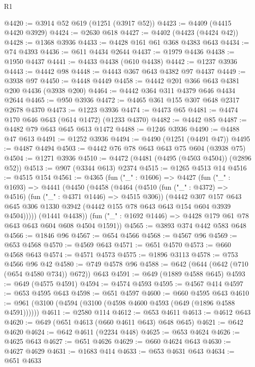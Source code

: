 \begin{lexlean}{R1}
\begin{coremodule}
@4420 := @3914 @52 @619 (@1251 (@3917 @52))
@4423 := @4409 (@4415 @4420 @3929)
@4424 := @2630 @618
@4427 := @4402 (@4423 (@4424 @42))
@4428 := @1368 @3936
@4433 := @4428 @161 @61 @368 @4383 @643
@4434 := @74 @4393
@4436 := @611 @4434 @2644
@4437 := @1979 @4436
@4438 := @1950 @4437
@4441 := @4433 @4438 (@610 @4438)
@4442 := @1237 @3936
@4443 := @4442 @98
@4448 := @4443 @367 @643 @4382 @97 @4437
@4449 := @3938 @97
@4450 := @4448 @4449
@4458 := @4442 @201 @366 @643 @4381 @200 @4436 (@3938 @200)
@4464 := @4442 @364 @311 @4379 @646 @4434 @2644
@4465 := @950 @3936
@4472 := @4465 @361 @155 @307 @648 @2317 @2678 @4370
@4473 := @1223 @3936
@4474 := @4473 @65
@4481 := @4474 @170 @646 @643 (@614 @1472) (@1233 @4370)
@4482 := @4442 @85
@4487 := @4482 @79 @643 @645 @613 @1472
@4488 := @1246 @3936
@4490 := @4488 @47 @613
@4491 := @1252 @3936
@4494 := @4490 (@1251 (@4491 @47))
@4495 := @4487 @4494
@4503 := @4442 @76 @78 @643 @643 @75 @604 (@3938 @75)
@4504 := @1271 @3936
@4510 := @4472 (@4481 (@4495 (@4503 @4504)) (@2896 @52))
@4513 := @907 (@3344 @613) @2374
@4515 := @1265 @4513 @14
@4516 := @4515 @154
@4561 := @4365
    (fun ("_" : @1606) =>
    @4427
      (fun ("_" : @1693) =>
      @4441
        (@4450
          (@4458
            (@4464
              (@4510 (fun ("_" : @4372) => @4516) (fun ("_" : @4371 @1446) => @4515 @306))
              (@4442
                @307
                @157
                @643
                @645
                @306
                @1330
                @3942
                (@4442 @155 @78 @643 @643 @154 @604 @3939 @4504)))))
        (@1441 @4438))
      (fun ("_" : @1692 @1446) => @4428 @179 @61 @78 @643 @643 @604 @608 @4504 @1591))
@4565 := @3893 @374 @442 @583 @648
@4566 := @1846 @96
@4567 := @654 @4566
@4568 := @4567 @96
@4569 := @653 @4568
@4570 := @4569 @643
@4571 := @651 @4570
@4573 := @660 @4568 @643
@4574 := @4571 @4573
@4575 := @1896 @3113
@4578 := @753 @4566 @96 @42
@4580 := @749 @4578 @96
@4588 := @642 (@644 (@642 (@710 (@654 @4580 @734)) @672)) @643
@4591 := @649 (@1889 @4588 @645)
@4593 := @649 (@4575 @4591)
@4594 := @4574 @4593
@4595 := @4567 @414
@4597 := @653 @4595 @643
@4598 := @651 @4597
@4600 := @660 @4595 @643
@4610 := @961 (@3100 (@4594 (@3100 (@4598 @4600 @4593 (@649 (@1896 @4588 @4591))))))
@4611 := @2580 @114
@4612 := @653 @4611
@4613 := @4612 @643
@4620 := @649 (@651 @4613 (@660 @4611 @643) @648 @645)
@4621 := @642 @4620
@4624 := @642 @4611 (@2234 @448)
@4625 := @653 @4624
@4626 := @4625 @643
@4627 := @651 @4626
@4629 := @660 @4624 @643
@4630 := @4627 @4629
@4631 := @1683 @414
@4633 := @653 @4631 @643
@4634 := @651 @4633

\end{coremodule}
\end{lexlean}
